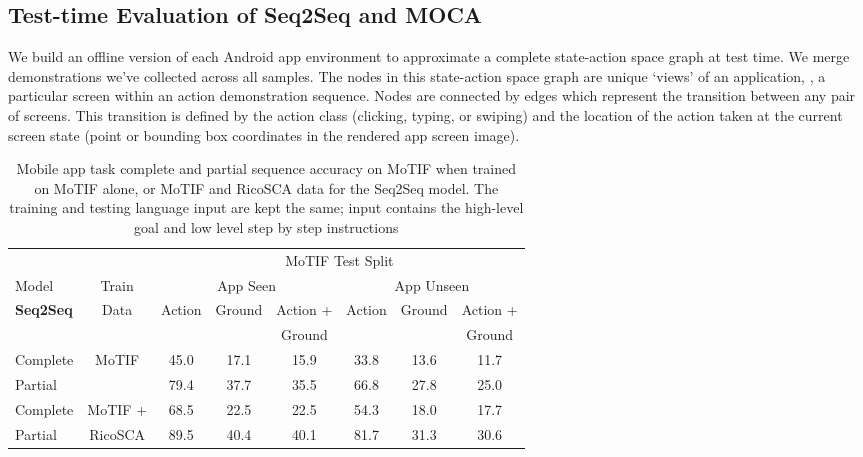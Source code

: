 \subsection{Test-time Evaluation of Seq2Seq and MOCA}
\label{sec:app_graph}
We build an offline version of each Android app environment to approximate a complete state-action space graph at test time. We merge demonstrations we've collected across all samples.
The nodes in this state-action space graph are unique `views' of an application, \ie, a particular screen within an action demonstration sequence. Nodes are connected by edges which represent the transition between any pair of screens. This transition is defined by the action class (clicking, typing, or swiping) and the location of the action taken at the current screen state (point or bounding box coordinates in the rendered app screen image).
\begin{table}[t]
    \centering
          \renewcommand\arraystretch{0.95}

        \caption{Mobile app task complete and partial sequence accuracy on MoTIF when trained on MoTIF alone, or MoTIF and RicoSCA data for the Seq2Seq model. The training and testing language input are kept the same; input contains the high-level goal and low level step by step instructions }
    \begin{tabular}{|l|c|c|c|c|c|c|c|}
    \hline
    & & \multicolumn{6}{c|}{MoTIF Test Split}\\
    \cline{3-8}
      Model & Train & \multicolumn{3}{c|}{App Seen} & \multicolumn{3}{c|}{App Unseen}\\
    \cline{3-8}
 \textbf{Seq2Seq} & Data & \multirow{2}{*}{Action} & \multirow{2}{*}{Ground} & Action + &  \multirow{2}{*}{Action} & \multirow{2}{*}{Ground} & Action +\\
   & & & & Ground& & & Ground\\
    \hline
    Complete & \multirow{2}{*}{MoTIF} & 45.0 & 17.1 & 15.9 & 33.8 & 13.6 & 11.7 \\
    Partial & & 79.4 & 37.7 & 35.5 & 66.8 & 27.8 & 25.0 \\
    \hline
    Complete & MoTIF + & 68.5 & 22.5 & 22.5 & 54.3 & 18.0 & 17.7 \\
    Partial & RicoSCA & 89.5 & 40.4 & 40.1 & 81.7 & 31.3 & 30.6 \\
    \hline
    \end{tabular}
    \label{tab:automate_full1}
\end{table}

